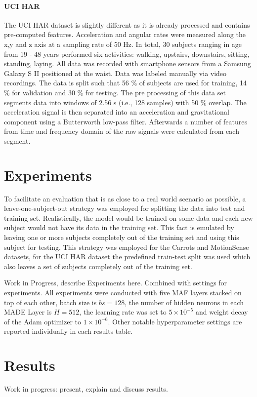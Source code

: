 \documentclass[11pt,titlepage,oneside,openany]{book}
\begin{document}
\paragraph{UCI HAR}
The UCI HAR dataset is slightly different as it is already processed and contains pre-computed features. Acceleration and angular rates were measured along the x,y and z axis at a sampling rate of 50 Hz. In total, 30 subjects ranging in age from 19 - 48 years performed six activities: walking, upstairs, downstairs, sitting, standing, laying. All data was recorded with smartphone sensors from a Samsung Galaxy S II positioned at the waist. Data was labeled manually via video recordings. The data is split such that 56 \% of subjects are used for training, 14 \% for validation and 30 \% for testing. The pre processing of this data set segments data into windows of 2.56 s (i.e., 128 samples) with 50 \% overlap. The acceleration signal is then separated into an acceleration and gravitational component using a Butterworth low-pass filter. Afterwards a number of features from time and frequency domain of the raw signals were calculated from each segment.


\section{Experiments}
\label{sec:exp}

To facilitate an evaluation that is as close to a real world scenario as possible, a leave-one-subject-out strategy was employed for splitting the data into test and training set. Realistically, the model would be trained on some data and each new subject would not have its data in the training set. This fact is emulated by leaving one or more subjects completely out of the training set and using this subject for testing. This strategy was employed for the Carrots and MotionSense datasets, for the UCI HAR dataset the predefined train-test split was used which also leaves a set of subjects completely out of the training set.

Work in Progress, describe Experiments here. Combined with settings for experiments.
All experiments were conducted with five MAF layers stacked on top of each other, batch size is $bs = 128$, the number of hidden neurons in each MADE Layer is $H=512$, the learning rate was set to $5 \times 10^{-5}$ and weight decay of the Adam optimizer to $1 \times 10^{-6}$. Other notable hyperparameter settings are reported individually in each results table.


\section{Results}
\label{sec:results}
Work in progress: present, explain and discuss results.
\end{document}
